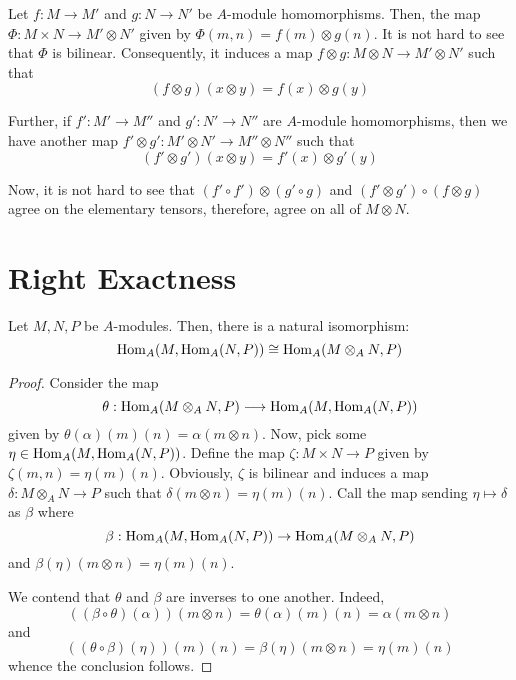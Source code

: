 Let $f: M\to M'$ and $g: N\to N'$ be $A$-module homomorphisms. Then, the map $\Phi: M\times N\to M'\otimes N'$ given by $\Phi(m,n) = f(m)\otimes g(n)$. It is not hard to see that $\Phi$ is bilinear. Consequently, it induces a map $f\otimes g: M\otimes N\to M'\otimes N'$ such that 
\begin{equation*}
    (f\otimes g)(x\otimes y) = f(x)\otimes g(y)
\end{equation*}

Further, if $f': M'\to M''$ and $g': N'\to N''$ are $A$-module homomorphisms, then we have another map $f'\otimes g': M'\otimes N'\to M''\otimes N''$ such that 
\begin{equation*}
    (f'\otimes g')(x\otimes y) = f'(x)\otimes g'(y)
\end{equation*}

Now, it is not hard to see that $(f'\circ f')\otimes(g'\circ g)$ and $(f'\otimes g')\circ(f\otimes g)$ agree on the elementary tensors, therefore, agree on all of $M\otimes N$.

\section{Right Exactness}

\begin{proposition}
    Let $M,N,P$ be $A$-modules. Then, there is a natural isomorphism:
    \begin{equation*}
        \operatorname{Hom}_A(M,\operatorname{Hom}_A(N, P))\cong\operatorname{Hom}_A(M\otimes_A N, P)
    \end{equation*}
\end{proposition}
\begin{proof}
    Consider the map 
    \begin{equation*}
        \theta: \operatorname{Hom}_A(M\otimes_A N, P)\longrightarrow\operatorname{Hom}_A(M,\operatorname{Hom}_A(N, P))
    \end{equation*}
    given by $\theta(\alpha)(m)(n) = \alpha(m\otimes n)$. Now, pick some $\eta\in\operatorname{Hom}_A(M,\operatorname{Hom}_A(N,P))$. Define the map $\zeta: M\times N\to P$ given by $\zeta(m, n) = \eta(m)(n)$. Obviously, $\zeta$ is bilinear and induces a map $\delta: M\otimes_A N\to P$ such that $\delta(m\otimes n) = \eta(m)(n)$. Call the map sending $\eta\mapsto\delta$ as $\beta$ where 
    \begin{equation*}
        \beta: \operatorname{Hom}_A(M,\operatorname{Hom}_A(N, P))\to\operatorname{Hom}_A(M\otimes_A N, P)
    \end{equation*}
    and $\beta(\eta)(m\otimes n) = \eta(m)(n)$.

    We contend that $\theta$ and $\beta$ are inverses to one another. Indeed, 
    \begin{equation*}
        ((\beta\circ\theta)(\alpha))(m\otimes n) = \theta(\alpha)(m)(n) = \alpha(m\otimes n)
    \end{equation*}
    and 
    \begin{equation*}
        ((\theta\circ\beta)(\eta))(m)(n) = \beta(\eta)(m\otimes n) = \eta(m)(n)
    \end{equation*}
    whence the conclusion follows.
\end{proof}

